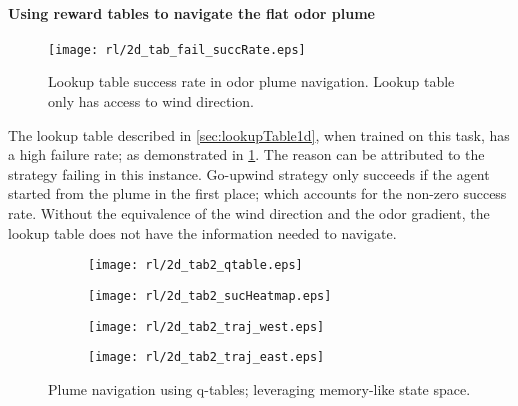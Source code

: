 \documentclass[../dissertation.tex]{subfiles}
\begin{document}
\paragraph{Using reward tables to navigate the flat odor plume}

\begin{figure}[ht]
    \centering
    \texttt{[image: rl/2d\_tab\_fail\_succRate.eps]}
    \caption{Lookup table success rate in odor plume navigation. Lookup table only has access to wind direction.}
    \label{fig:2dplume_tab_failRate}
\end{figure}

The lookup table described in \cref{sec:lookupTable1d}, when trained on this task, has a high failure rate; as demonstrated in \cref{fig:2dplume_tab_failRate}.
The reason can be attributed to the strategy failing in this instance.
Go-upwind strategy only succeeds if the agent started from the plume in the first place; which accounts for the non-zero success rate.
Without the equivalence of the wind direction and the odor gradient, the lookup table does not have the information needed to navigate.

\begin{figure}[p]
    \centering
    \begin{subfigure}[h]{0.6\textwidth}
        \texttt{[image: rl/2d\_tab2\_qtable.eps]}
        \label{fig:2dnewtable_qval}
    \end{subfigure}
    \begin{subfigure}[h]{0.3\textwidth}
        \texttt{[image: rl/2d\_tab2\_sucHeatmap.eps]}
        \label{fig:2dnewtable_succ}
    \end{subfigure}
    
    \par\bigskip

    \begin{subfigure}[b]{0.4\textwidth}
        \texttt{[image: rl/2d\_tab2\_traj\_west.eps]}
        \label{fig:2dnewtable_west}
    \end{subfigure}
    \hfill
    \begin{subfigure}[b]{0.4\textwidth}
        \texttt{[image: rl/2d\_tab2\_traj\_east.eps]}
        \label{fig:2dnewtable_east}
    \end{subfigure}
    
    \caption{Plume navigation using q-tables; leveraging memory-like state space.}
    \label{fig:2dnewtable}
\end{figure}
\end{document}
